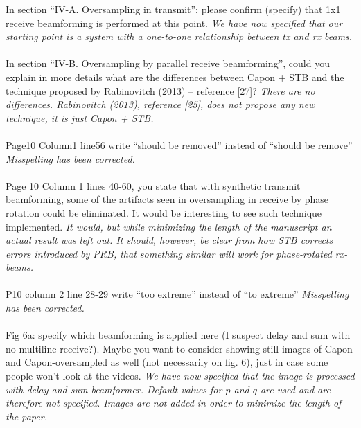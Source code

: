 \documentclass{article}
\begin{document}
In section “IV-A. Oversampling in transmit”: please confirm (specify) that 1x1 receive beamforming is performed at this point.
\textit{We have now specified that our starting point is a system with a one-to-one relationship between tx and rx beams.}
\\\\
In section “IV-B. Oversampling by parallel receive beamforming”, could you explain in more details what are the differences between Capon + STB and the technique proposed by Rabinovitch (2013) – reference [27]?
\textit{There are no differences. Rabinovitch (2013), reference [25], does not propose any new technique, it is just Capon + STB.}
\\\\
Page10 Column1 line56  write “should be removed” instead of “should be remove”
\textit{Misspelling has been corrected.}
\\\\
Page 10 Column 1 lines 40-60, you state that with synthetic transmit beamforming, some of the artifacts seen in oversampling in receive by phase rotation could be eliminated. It would be interesting to see such technique implemented.
\textit{It would, but while minimizing the length of the manuscript an actual result was left out. It should, however, be clear from how STB corrects errors introduced by PRB, that something similar will work for phase-rotated rx-beams.}
\\\\
P10 column 2 line 28-29 write “too extreme” instead of “to extreme”
\textit{Misspelling has been corrected.}
\\\\
Fig 6a: specify which beamforming is applied here (I suspect delay and sum with no multiline receive?). Maybe you want to consider showing still images of Capon and Capon-oversampled as well (not necessarily on fig. 6), just in case some people won’t look at the videos.
\textit{We have now specified that the image is processed with delay-and-sum beamformer. Default values for $p$ and $q$ are used and are therefore not specified. Images are not added in order to minimize the length of the paper.}
\end{document}
